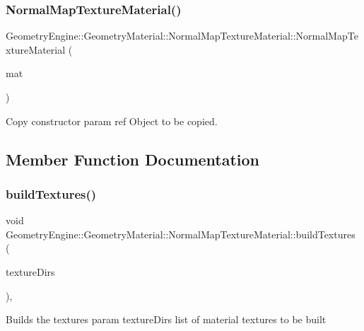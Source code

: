 \subsubsection{\texorpdfstring{NormalMapTextureMaterial()}{NormalMapTextureMaterial()}\hspace{0.1cm}{\footnotesize\ttfamily [2/2]}}
{\footnotesize\ttfamily Geometry\+Engine\+::\+Geometry\+Material\+::\+Normal\+Map\+Texture\+Material\+::\+Normal\+Map\+Texture\+Material (\begin{DoxyParamCaption}\item[{const \mbox{\hyperlink{class_geometry_engine_1_1_geometry_material_1_1_normal_map_texture_material}{Normal\+Map\+Texture\+Material}} \&}]{mat }\end{DoxyParamCaption})}

Copy constructor param ref Object to be copied. 

\subsection{Member Function Documentation}
\mbox{\label{class_geometry_engine_1_1_geometry_material_1_1_normal_map_texture_material_a42321fbd382c20de406f80d44849c183}} 
\subsubsection{\texorpdfstring{buildTextures()}{buildTextures()}}
{\footnotesize\ttfamily void Geometry\+Engine\+::\+Geometry\+Material\+::\+Normal\+Map\+Texture\+Material\+::build\+Textures (\begin{DoxyParamCaption}\item[{const std\+::list$<$ \mbox{\hyperlink{class_geometry_engine_1_1_geometry_material_1_1_texture_parameters}{Texture\+Parameters}} $\ast$ $>$ \&}]{texture\+Dirs }\end{DoxyParamCaption})\hspace{0.3cm}{\ttfamily [protected]}, {\ttfamily [virtual]}}

Builds the textures param texture\+Dirs list of material textures to be built 

